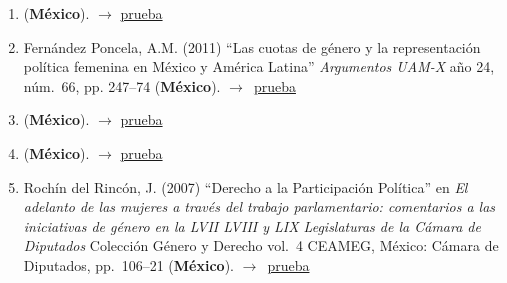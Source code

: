 \documentclass[12 pt, letter]{article}
\newenvironment{CitasMiTrabajo}{
    \begin{footnotesize}
    \begin{enumerate}[label={\footnotesize\emph{cita~\arabic*}},ref=\arabic*] %
        \setlength{\itemsep}{.1\itemsep}
        \setlength{\parskip}{.1\parskip}
    }{\end{enumerate}\end{footnotesize}}
\begin{document}
        \begin{CitasMiTrabajo}

        \item {} (\textbf{M\'exico}). $\rightarrow$ \href{https://github.com/emagar/cv/blob/master/citasMiTrab/huertaMagar/arroyo.etal2008.pdf}{prueba}

        \item Fern\'andez Poncela, A.M. (2011) ``Las cuotas de g\'enero y la representaci\'on pol\'itica femenina en M\'exico y Am\'erica Latina''
            \emph{Argumentos UAM-X} a\~no 24, n\'um.\ 66, pp. 247--74 (\textbf{M\'exico}). $\rightarrow$~\href{https://github.com/emagar/cv/blob/master/citasMiTrab/huertaMagar/fdzPoncela2011.pdf}{prueba}

        \item {} (\textbf{M\'exico}). $\rightarrow$ \href{https://github.com/emagar/cv/blob/master/citasMiTrab/huertaMagar/gonzalezMarin2008.pdf}{prueba}

        \item {} (\textbf{M\'exico}). $\rightarrow$ \href{https://github.com/emagar/cv/blob/master/citasMiTrab/huertaMagar/martinez.garridoRepresentacionDescSustMx2013rms.pdf}{prueba}

        \item Roch\'in del Rinc\'on, J. (2007)
        ``Derecho a la Participaci\'on Pol\'itica''
        en \emph{El adelanto de las mujeres a trav\'es del trabajo parlamentario:
        comentarios a las iniciativas de g\'enero en la LVII LVIII y LIX
        Legislaturas de la C\'amara de Diputados}
        Colecci\'on G\'enero y Derecho vol.\ 4 CEAMEG,
        M\'exico: C\'amara de Diputados, pp.\ 106--21 (\textbf{M\'exico}). $\rightarrow$~\href{https://github.com/emagar/cv/blob/master/citasMiTrab/huertaMagar/cdip.pdf}{prueba}

        \label{ncites:magar.huerta.2006} %

        \end{CitasMiTrabajo}





\end{document}
